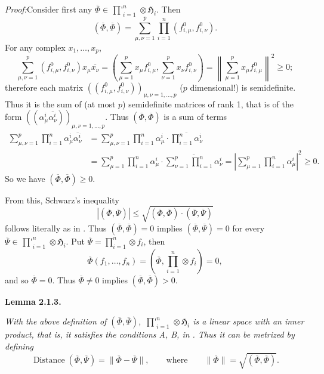 \documentclass[12pt,b5paper,twoside]{article}
\newcommand{\Hspace}{\mathfrak H}
\newcommand{\Lemma}[1]{%
  \par\smallskip\noindent\phantomsection\label{lem:#1}\textbf{Lemma #1.}\enspace
}
\newcommand{\Proof}{\par\noindent\textit{Proof:}\enspace}
\begin{document}
\Proof Consider first any
$\overline{\Phi}\in\mathop{\prod\nolimits'}_{i=1}^{n}
\otimes\Hspace_i$. Then
\[
 (\overline{\Phi},\overline{\Phi})=\sum_{\mu,\nu=1}^{p}
              \prod_{i=1}^{n}(f_{i,\mu}^0,f_{i,\nu}^0).
\]
For any complex $x_1,\ldots,x_p$,
\[
 \sum_{\mu,\nu=1}^{p}(f_{i,\mu}^0,f_{i,\nu}^0)x_\mu\overline{x_\nu}
 =\left(\sum_{\mu=1}^{p}x_\mu f_{i,\mu}^0,
        \sum_{\nu=1}^{p}x_\nu f_{i,\nu}^0\right)
 =\left\lVert\sum_{\mu=1}^{p}x_\mu f_{i,\mu}^0\right\rVert^2\geq0;
\]
therefore each matrix
$((f_{i,\mu}^0,f_{i,\nu}^0))_{\mu,\nu=1,\ldots,p}$ ($p$ dimensional!) is
semidefinite. Thus it is the sum of (at most $p$) semidefinite matrices of
rank 1, that is of the form
$((\alpha_\mu^i\overline{\alpha_\nu^i}))_{\mu,\nu=1,\ldots,p}$. Thus
$(\overline{\Phi},\overline{\Phi})$ is a sum of terms
\begin{align*}
 \sum_{\mu,\nu=1}^{p}\prod_{i=1}^{n}
       \alpha_\mu^i\overline{\alpha_\nu^i}
 &=\sum_{\mu,\nu=1}^{p}\prod_{i=1}^{n}\alpha_\mu^i
       \cdot\overline{\prod_{i=1}^{n}\alpha_\nu^i}\\
 &=\sum_{\mu=1}^{p}\prod_{i=1}^{n}\alpha_\mu^i
       \cdot\overline{\sum_{\nu=1}^{p}\prod_{i=1}^{n}\alpha_\nu^i}
  =\left|\sum_{\mu=1}^{p}\prod_{i=1}^{n}\alpha_\mu^i\right|^2\geq0.
\end{align*}
So we have $(\overline{\Phi},\overline{\Phi})\geq0$.

From this, Schwarz's inequality
\[
 |(\overline{\Phi},\overline{\Psi})|
 \leq\sqrt{(\overline{\Phi},\overline{\Phi})
 \cdot(\overline{\Psi},\overline{\Psi})}
\]
follows literally as in \cite[p.~64]{ref16}. Thus
$(\overline{\Phi},\overline{\Phi})=0$ implies
$(\overline{\Phi},\overline{\Psi})=0$ for every
$\overline{\Psi}\in\mathop{\prod\nolimits'}_{i=1}^{n}\otimes\Hspace_i$.
Put $\overline{\Psi}=\prod_{i=1}^{n}\otimes f_i$, then
\[
 \overline{\Phi}(f_1,\ldots,f_n)
   =\left(\overline{\Phi},\prod_{i=1}^{n}\otimes f_i\right)=0,
\]
and so $\overline{\Phi}=0$. Thus $\overline{\Phi}\ne0$ implies
$(\overline{\Phi},\overline{\Phi})>0$.

\Lemma{2.1.3}
{\itshape
With the above definition of $(\overline{\Phi},\overline{\Psi})$,
$\mathop{\prod\nolimits'}_{i=1}^{n}\otimes\Hspace_i$ is a linear space with
an inner product, that is, it satisfies the conditions A, B, in
\cite[p.~64]{ref16}. Thus it can be metrized by defining
\[
 \operatorname{Distance}(\overline{\Phi},\overline{\Psi})
 =\lVert\overline{\Phi}-\overline{\Psi}\rVert,
 \qquad\text{where}\qquad
 \lVert\overline{\Phi}\rVert
 =\sqrt{(\overline{\Phi},\overline{\Phi})}.
\]}
\end{document}
